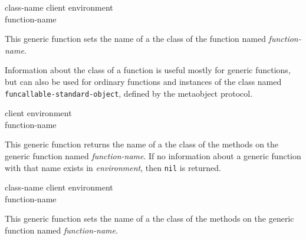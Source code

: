  {class-name client environment \\
function-name}

This generic function sets the name of a the class of the function
named \textit{function-name}.

Information about the class of a function is useful mostly for generic
functions, but can also be used for ordinary functions and instances
of the class named \texttt{funcallable-standard-object}, defined by
the metaobject protocol.

 {client environment \\ function-name}

This generic function returns the name of a the class of the methods
on the generic function named \textit{function-name}.  If no information
about a generic function with that name exists in
\textit{environment}, then \texttt{nil} is returned.

 {class-name client environment \\
function-name}

This generic function sets the name of a the class of the methods on
the generic function named \textit{function-name}.
